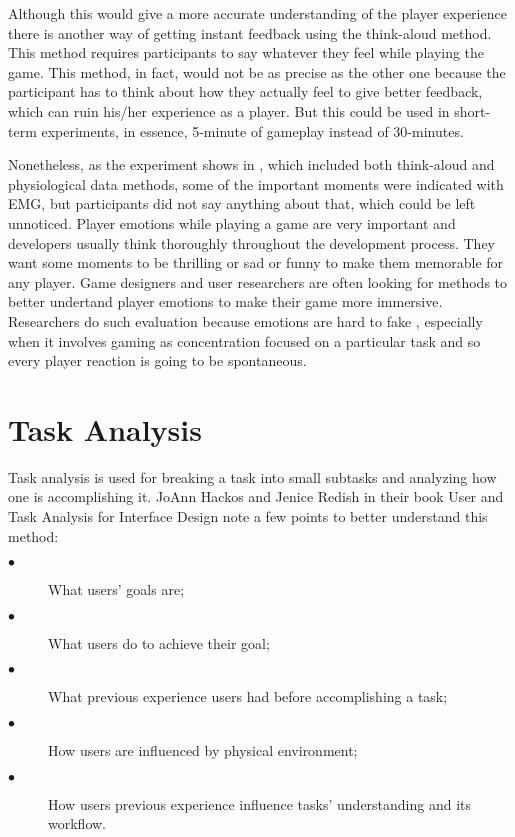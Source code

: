 \documentclass{scrartcl}
\begin{document}
Although this would give a more accurate understanding of the player experience there is another way of getting instant feedback using the think-aloud method. This method requires participants to say whatever they feel while playing the game. This method, in fact, would not be as precise as the other one because the participant has to think about how they actually feel to give better feedback, which can ruin his/her experience as a player. But this could be used in short-term experiments, in essence, 5-minute of gameplay instead of 30-minutes. 

Nonetheless, as the experiment shows in \cite{tan2014combining}, which included both think-aloud and physiological data methods, some of the important moments were indicated with EMG, but participants did not say anything about that, which could be left unnoticed. Player emotions while playing a game are very important and developers usually think thoroughly throughout the development process. They want some moments to be thrilling or sad or funny to make them memorable for any player. Game designers and user researchers are often looking for methods to better undertand player emotions \cite{nacke2015games} to make their game more immersive. Researchers do such evaluation because emotions are hard to fake \cite{nacke2015games}, especially when it involves gaming as concentration focused on a particular task and so every player reaction is going to be spontaneous.

\section{Task Analysis}

Task analysis is used for breaking a task into small subtasks \cite{taimplementation} and analyzing how one is accomplishing it. JoAnn Hackos and Jenice Redish in their book User and Task Analysis for Interface Design \cite{hackos1998user} note a few points to better understand this method:

\begin{description}
  \item[$\bullet$] What users' goals are;
  \item[$\bullet$] What users do to achieve their goal;
  \item[$\bullet$] What previous experience users had before accomplishing a task;
  \item[$\bullet$] How users are influenced by physical environment;
  \item[$\bullet$] How users previous experience influence tasks' understanding and its workflow.
\end{description}
\end{document}
